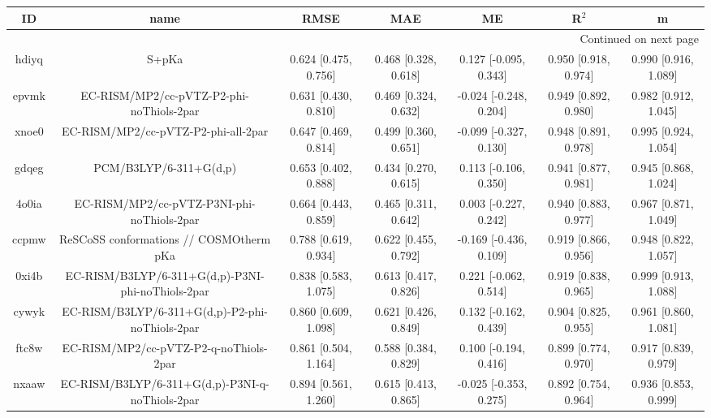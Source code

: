 \documentclass{article}
\begin{document}
\begin{center}
\begin{longtable}{|ccccccc|}
\toprule
    ID &                                               name &                  RMSE &                   MAE &                      ME &                 R$^2$ &                      m \\
\midrule
\endhead
\midrule
\multicolumn{7}{r}{{Continued on next page}} \\
\midrule
\endfoot

\bottomrule
\endlastfoot
 hdiyq &                                              S+pKa &  0.624 [0.475, 0.756] &  0.468 [0.328, 0.618] &   0.127 [-0.095, 0.343] &  0.950 [0.918, 0.974] &   0.990 [0.916, 1.089] \\
 epvmk &           EC-RISM/MP2/cc-pVTZ-P2-phi-noThiols-2par &  0.631 [0.430, 0.810] &  0.469 [0.324, 0.632] &  -0.024 [-0.248, 0.204] &  0.949 [0.892, 0.980] &   0.982 [0.912, 1.045] \\
 xnoe0 &                EC-RISM/MP2/cc-pVTZ-P2-phi-all-2par &  0.647 [0.469, 0.814] &  0.499 [0.360, 0.651] &  -0.099 [-0.327, 0.130] &  0.948 [0.891, 0.978] &   0.995 [0.924, 1.054] \\
 gdqeg &                             PCM/B3LYP/6-311+G(d,p) &  0.653 [0.402, 0.888] &  0.434 [0.270, 0.615] &   0.113 [-0.106, 0.350] &  0.941 [0.877, 0.981] &   0.945 [0.868, 1.024] \\
 4o0ia &         EC-RISM/MP2/cc-pVTZ-P3NI-phi-noThiols-2par &  0.664 [0.443, 0.859] &  0.465 [0.311, 0.642] &   0.003 [-0.227, 0.242] &  0.940 [0.883, 0.977] &   0.967 [0.871, 1.049] \\
 ccpmw &            ReSCoSS conformations // COSMOtherm pKa &  0.788 [0.619, 0.934] &  0.622 [0.455, 0.792] &  -0.169 [-0.436, 0.109] &  0.919 [0.866, 0.956] &   0.948 [0.822, 1.057] \\
 0xi4b &  EC-RISM/B3LYP/6-311+G(d,p)-P3NI-phi-noThiols-2par &  0.838 [0.583, 1.075] &  0.613 [0.417, 0.826] &   0.221 [-0.062, 0.514] &  0.919 [0.838, 0.965] &   0.999 [0.913, 1.088] \\
 cywyk &    EC-RISM/B3LYP/6-311+G(d,p)-P2-phi-noThiols-2par &  0.860 [0.609, 1.098] &  0.621 [0.426, 0.849] &   0.132 [-0.162, 0.439] &  0.904 [0.825, 0.955] &   0.961 [0.860, 1.081] \\
 ftc8w &             EC-RISM/MP2/cc-pVTZ-P2-q-noThiols-2par &  0.861 [0.504, 1.164] &  0.588 [0.384, 0.829] &   0.100 [-0.194, 0.416] &  0.899 [0.774, 0.970] &   0.917 [0.839, 0.979] \\
 nxaaw &    EC-RISM/B3LYP/6-311+G(d,p)-P3NI-q-noThiols-2par &  0.894 [0.561, 1.260] &  0.615 [0.413, 0.865] &  -0.025 [-0.353, 0.275] &  0.892 [0.754, 0.964] &   0.936 [0.853, 0.999] \\

\end{longtable}
\end{center}
\end{document}
